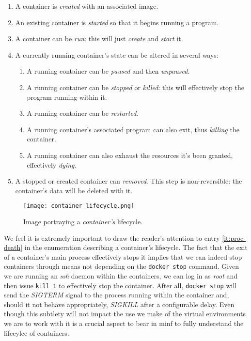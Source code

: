                 \begin{enumerate}
                    \item A container is \textit{created} with an associated image.
                    \item An existing container is \textit{started} so that it begins running a program.
                    \item A container can be \textit{run}: this will just \textit{create} and \textit{start} it.
                    \item A currently running container's state can be altered in several ways:
                    \begin{enumerate}
                        \item A running container can be \textit{paused} and then \textit{unpaused}.
                        \item A running container can be \textit{stopped} or \textit{killed}: this will effectively stop the program running within it.
                        \item A running container can be \textit{restarted}.
                        \item A running container's associated program can also exit, thus \textit{killing} the container. \label{it:proc-death}
                        \item A running container can also exhaust the resources it's been granted, effectively \textit{dying}.
                    \end{enumerate}
                    \item A stopped or created container can \textit{removed}. This step is non-reversible: the container's data will be deleted with it.
                \end{enumerate}

                \begin{sidewaysfigure}
                    \centering
                    \texttt{[image: container\_lifecycle.png]}
                    \caption[Container Lifecycle]{Image portraying a \textit{container's} lifecycle. \cite{bib:container-lifecycle}}
                    \label{fig:container-lifecycle}
                \end{sidewaysfigure}

                We feel it is extremely important to draw the reader's attention to entry \ref{it:proc-death} in the enumeration describing a container's lifecycle. The fact that the exit of a container's main process effectively stops it implies that we can indeed stop containers through means not depending on the \texttt{docker stop} command. Given we are running an \textit{ssh} daemon within the containers, we can log in as \textit{root} and then issue \texttt{kill 1} to effectively stop the container. After all, \texttt{docker stop} will send the \textit{SIGTERM} signal to the process running within the container and, should it not behave appropriately, \textit{SIGKILL} after a configurable delay. Even though this subtlety will not impact the use we make of the virtual environments we are to work with it is a crucial aspect to bear in minf to fully understand the lifecylce of containers.\\

